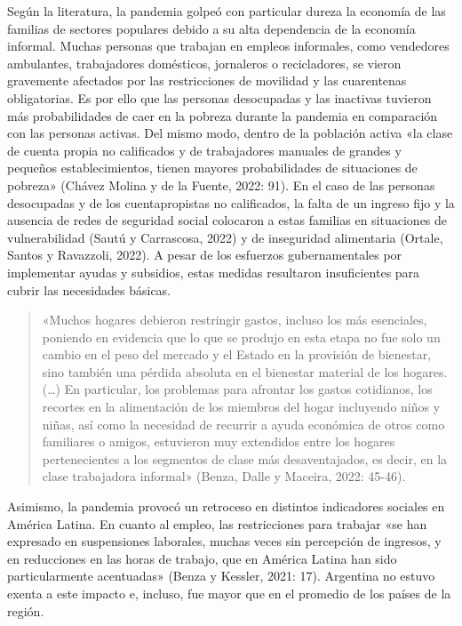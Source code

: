 Según la literatura, la pandemia golpeó con particular dureza la economía de las familias de sectores populares debido a su alta dependencia de la economía informal. Muchas personas que trabajan en empleos informales, como vendedores ambulantes, trabajadores domésticos, jornaleros o recicladores, se vieron gravemente afectados por las restricciones de movilidad y las cuarentenas obligatorias. Es por ello que las personas desocupadas y las inactivas tuvieron más probabilidades de caer en la pobreza durante la pandemia en comparación con las personas activas. Del mismo modo, dentro de la población activa «la clase de cuenta propia no calificados y de trabajadores manuales de grandes y pequeños establecimientos, tienen mayores probabilidades de situaciones de pobreza» (Chávez Molina y de la Fuente, 2022: 91). En el caso de las personas desocupadas y de los cuentapropistas no calificados, la falta de un ingreso fijo y la ausencia de redes de seguridad social colocaron a estas familias en situaciones de vulnerabilidad (Sautú y Carrascosa, 2022) y de inseguridad alimentaria (Ortale, Santos y Ravazzoli, 2022). A pesar de los esfuerzos gubernamentales por implementar ayudas y subsidios, estas medidas resultaron insuficientes para cubrir las necesidades básicas.

\begin{quote}
«Muchos hogares debieron restringir gastos, incluso los más esenciales, poniendo en evidencia que lo que se produjo en esta etapa no fue solo un cambio en el peso del mercado y el Estado en la provisión de bienestar, sino también una pérdida absoluta en el bienestar material de los hogares. (\ldots) En particular, los problemas para afrontar los gastos cotidianos, los recortes en la alimentación de los miembros del hogar incluyendo niños y niñas, así como la necesidad de recurrir a ayuda económica de otros como familiares o amigos, estuvieron muy extendidos entre los hogares pertenecientes a los segmentos de clase más desaventajados, es decir, en la clase trabajadora informal» (Benza, Dalle y Maceira, 2022: 45-46).
\end{quote}

Asimismo, la pandemia provocó un retroceso en distintos indicadores sociales en América Latina. En cuanto al empleo, las restricciones para trabajar «se han expresado en suspensiones laborales, muchas veces sin percepción de ingresos, y en reducciones en las horas de trabajo, que en América Latina han sido particularmente acentuadas» (Benza y Kessler, 2021: 17). Argentina no estuvo exenta a este impacto e, incluso, fue mayor que en el promedio de los países de la región.

